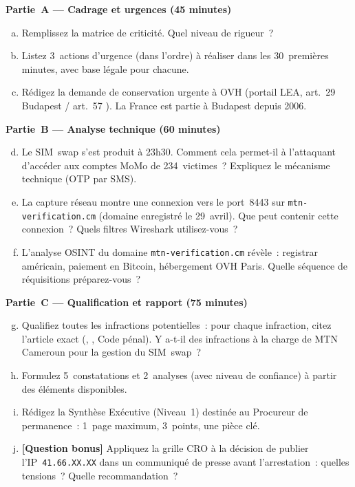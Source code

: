 \begin{boxexo}[title={\ding{45}\quad Examen --- Opération DIBAMBA (3 heures)}]
\textbf{Partie~A --- Cadrage et urgences (45 minutes)}

\begin{enumerate}[(a)]
    \item Remplissez la matrice de criticité. Quel niveau de rigueur~?
    \item Listez 3~actions d'urgence (dans l'ordre) à réaliser
          dans les 30~premières minutes, avec base légale pour chacune.
    \item Rédigez la demande de conservation urgente à OVH (portail
          LEA, art.~29 Budapest / art.~57 ).
          La France est partie à Budapest depuis 2006.
\end{enumerate}

\textbf{Partie~B --- Analyse technique (60 minutes)}

\begin{enumerate}[(a)]
    \setcounter{enumi}{3}
    \item Le SIM~swap s'est produit à 23h30. Comment cela permet-il
          à l'attaquant d'accéder aux comptes MoMo de 234~victimes~?
          Expliquez le mécanisme technique (OTP par SMS).
    \item La capture réseau montre une connexion vers le port~8443
          sur \texttt{mtn-verification.cm} (domaine enregistré
          le 29~avril). Que peut contenir cette connexion~?
          Quels filtres Wireshark utilisez-vous~?
    \item L'analyse OSINT du domaine \texttt{mtn-verification.cm}
          révèle~: registrar américain, paiement en Bitcoin,
          hébergement OVH Paris. Quelle séquence de réquisitions
          préparez-vous~?
\end{enumerate}

\textbf{Partie~C --- Qualification et rapport (75 minutes)}

\begin{enumerate}[(a)]
    \setcounter{enumi}{6}
    \item Qualifiez toutes les infractions potentielles~: pour chaque
          infraction, citez l'article exact (,
          , Code pénal). Y a-t-il des infractions
          à la charge de MTN Cameroun pour la gestion du SIM~swap~?
    \item Formulez 5~constatations et 2~analyses (avec niveau de
          confiance) à partir des éléments disponibles.
    \item Rédigez la Synthèse Exécutive (Niveau~1) destinée
          au Procureur de permanence~: 1~page maximum,
          3~points, une pièce clé.
    \item \textbf{[Question bonus]} Appliquez la grille CRO à la
          décision de publier l'IP~\texttt{41.66.XX.XX} dans un
          communiqué de presse avant l'arrestation~: quelles
          tensions~? Quelle recommandation~?
\end{enumerate}
\end{boxexo}

